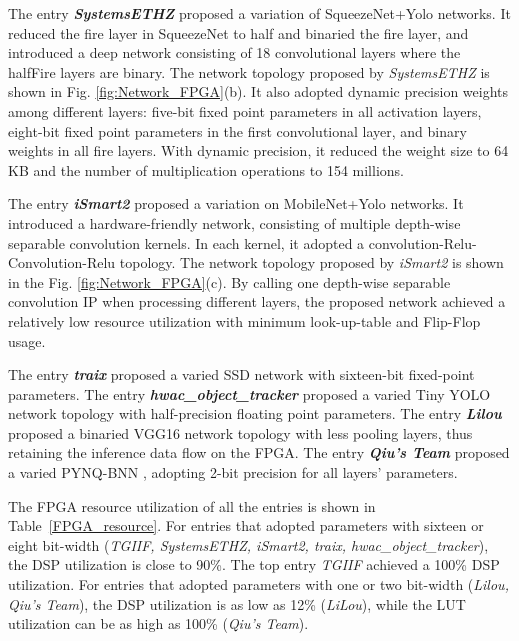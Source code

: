 \documentclass[10pt,journal,compsoc]{IEEEtran}
\begin{document}
The entry \emph{\textbf{SystemsETHZ}} proposed a variation of SqueezeNet+Yolo networks.
It reduced the fire layer in SqueezeNet to half and binaried the fire layer, and introduced a deep network consisting of 18 convolutional layers where the halfFire layers are binary.
The network topology proposed by \emph{{SystemsETHZ}} is shown in Fig. \ref{fig:Network_FPGA}(b).
It also adopted dynamic precision weights among different layers: five-bit fixed point parameters in all activation layers, eight-bit fixed point parameters in the first convolutional layer, and binary weights in all fire layers.
With dynamic precision, it reduced the weight size to 64 KB and the number of multiplication operations to 154 millions.


The entry \emph{\textbf{iSmart2}} proposed a variation on MobileNet+Yolo networks.
It introduced a hardware-friendly network, consisting of multiple depth-wise separable convolution kernels. In each kernel, it adopted a convolution-Relu-Convolution-Relu topology.
The network topology proposed by \emph{{iSmart2}} is shown in the Fig. \ref{fig:Network_FPGA}(c).
By calling one depth-wise separable convolution IP when processing different layers, the proposed network achieved a relatively low resource utilization with minimum look-up-table and Flip-Flop usage.

The entry \emph{\textbf{traix}} proposed a varied SSD network with sixteen-bit fixed-point parameters.
The entry \emph{\textbf{hwac\_object\_tracker}} proposed a varied Tiny YOLO network topology with half-precision floating point parameters.
The entry \emph{\textbf{Lilou}} proposed a binaried VGG16 network topology with less pooling layers, thus retaining the inference data flow on the FPGA.
The entry \emph{\textbf{Qiu's Team}} proposed a varied PYNQ-BNN \cite{bnnpynq}, adopting 2-bit precision for all layers' parameters.

The FPGA resource utilization of all the entries is shown in Table~\ref{FPGA_resource}.
For entries that adopted parameters with sixteen or eight bit-width (\emph{{TGIIF, SystemsETHZ, iSmart2, traix, hwac\_object\_tracker}}), the DSP utilization is close to 90\%. The top entry \emph{{TGIIF}} achieved a 100\% DSP utilization.
For entries that adopted parameters with one or two bit-width (\emph{{Lilou, Qiu's Team}}), the DSP utilization is as low as 12\% (\emph{{LiLou}}), while the LUT utilization can be as high as 100\% (\emph{{Qiu's Team}}).
\end{document}
